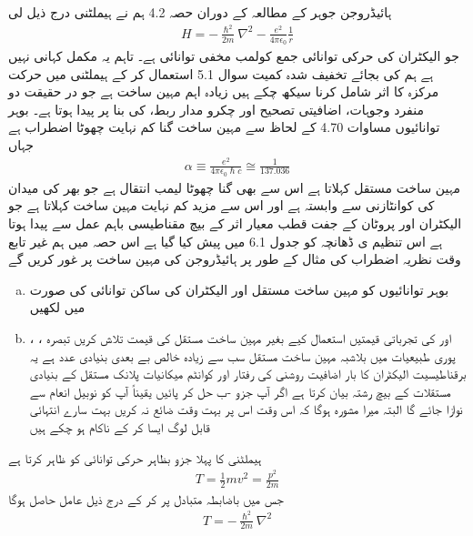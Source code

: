 ہائیڈروجن جوہر کے مطالعہ کے دوران حصہ 4.2 ہم نے   ہیملٹنی  درج ذیل لی 
\begin{align}
H = - \frac{\hslash^2}{2m} \nabla^2 - \frac{e^2}{4 \pi \epsilon_0} \frac{1}{r}
\end{align}
جو الیکٹران کی حرکی توانائی جمع کولمب مخفی توانائی ہے۔ تاہم یہ مکمل کہانی نہیں ہے ہم  کی بجائے تخفیف   شدہ  کمیت سوال 5.1 استعمال  کر کے  ہیملٹنی میں حرکت مرکزہ کا اثر شامل  کرنا سیکھ چکے ہیں زیادہ اہم مہین ساخت ہے جو در حقیقت دو منفرد وجوہات،  اضافیتی تصحیح اور چکرو مدار   ربط،  کی بنا پر پیدا ہوتا ہے۔ بوہر توانائیوں مساوات 4.70 کے لحاظ سے مہین ساخت  گنا کم  نہایت چھوٹا اضطراب ہے جہاں 
\begin{align}
\alpha \equiv \frac{e^2}{4 \pi \epsilon_0 \hslash c} \cong \frac{1}{137.036}
\end{align} 
مہین ساخت مستقل کہلاتا ہے اس سے بھی  گنا چھوٹا  لیمب انتقال ہے جو بھر کی میدان کی کوانٹازنی سے وابستہ ہے اور اس سے مزید کم نہایت مہین ساخت کہلاتا ہے جو الیکٹران اور پروٹان کے جفت قطب  معیار اثر کے بیچ مقناطیسی باہم عمل سے پیدا ہوتا ہے اس   تنظیم ی  ڈھانچہ کو جدول 6.1 میں پیش کیا گیا ہے اس حصہ میں ہم غیر تابع  وقت نظریہ اضطراب کی مثال کے طور پر ہائیڈروجن کی مہین ساخت پر غور کریں گے 
\begin{enumerate}[a.]
\item
بوہر توانائیوں کو مہین ساخت مستقل اور الیکٹران کی ساکن توانائی  کی صورت میں لکھیں 
\item
{}، ،  اور  کی تجرباتی قیمتیں  استعمال کیے بغیر مہین ساخت مستقل کی قیمت تلاش کریں تبصرہ پوری طبیعیات میں بلاشبہ مہین ساخت مستقل سب سے زیادہ خالص بے بعدی  بنیادی عدد ہے یہ برقناطیسیت  الیکٹران کا بار اضافیت روشنی کی رفتار اور کوانٹم میکانیات پلانک مستقل کے بنیادی مستقلات کے بیچ رشتہ بیان کرتا ہے اگر آپ جزو -ب حل کر پائیں  یقیناً   آپ کو نوبیل انعام سے نوازا جائے گا البتہ میرا مشورہ ہوگا کہ اس وقت اس پر بہت وقت ضائع نہ کریں بہت سارے انتہائی قابل لوگ ایسا  کر کے  ناکام ہو چکے ہیں  
\end{enumerate}
ہیملٹنی کا پہلا جزو بظاہر حرکی توانائی کو ظاہر کرتا ہے 
\begin{align}
T = \frac{1}{2} mv^2 = \frac{p^2}{2m} 
\end{align}
جس میں باضابطہ متبادل  پر کر کے درج ذیل عامل حاصل ہوگا 
\begin{align}
T = - \frac{\hslash^2}{2m} \nabla^2
\end{align} 

